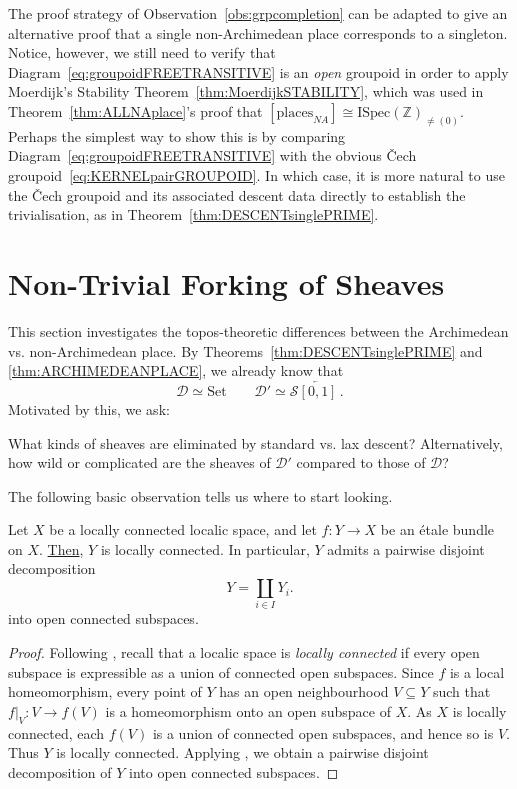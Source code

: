 \documentclass[a4paper, 11pt,reqno]{amsart}
\newcommand{\Set}{\mathrm{Set}}
\newcommand{\ISpec}{\mathrm{ISpec}}
\newcommand{\baseS}{\mathcal{S}}
\newcommand{\D}{\mathcal{D}}
\newcommand{\Z}{\mathbb{Z}}
\begin{document}
\begin{remark} The proof strategy of Observation~\ref{obs:grpcompletion} can be adapted to give an alternative proof that a single non-Archimedean place corresponds to a singleton. Notice, however, we still need to verify that Diagram~\eqref{eq:groupoidFREETRANSITIVE} is an {\em open} groupoid in order to apply Moerdijk's Stability Theorem~\ref{thm:MoerdijkSTABILITY}, which was used in Theorem~\ref{thm:ALLNAplace}'s proof that $[\mathrm{places}_{NA}]\cong \ISpec(\Z)_{\neq (0)}$.  Perhaps the simplest way to show this is by comparing Diagram~\eqref{eq:groupoidFREETRANSITIVE} with the obvious \v{C}ech groupoid~\eqref{eq:KERNELpairGROUPOID}. In which case, it is more natural to use the \v{C}ech groupoid and its associated descent data directly to establish the trivialisation, as in Theorem~\ref{thm:DESCENTsinglePRIME}.
 \end{remark}


\section{Non-Trivial Forking of Sheaves}\label{sec:ARCHvsNONARCH} This section investigates the topos-theoretic differences between the Archimedean vs. non-Archimedean place. By Theorems~\ref{thm:DESCENTsinglePRIME} and \ref{thm:ARCHIMEDEANPLACE}, we already know that
$$\D\simeq\Set\qquad\D'\simeq \baseS\overleftarrow{[0,1]}\,.$$
Motivated by this, we ask: 
\begin{question}\label{qn:forkLAXdescent} What kinds of sheaves are eliminated by standard vs. lax descent? Alternatively, how wild or complicated are the sheaves of $\D'$ compared to those of $\D$? 
\end{question}

The following basic observation tells us where to start looking.

\begin{observation}\label{obs:YdisjointDECOMPOSITION} Let $X$ be a locally connected localic space, and let $f\colon Y\to X$ be an \'{e}tale bundle on $X$. \underline{Then}, $Y$ is locally connected. In particular, $Y$ admits a pairwise disjoint decomposition
		\begin{equation}\label{eq:Ydecomposition}
	Y=\displaystyle\coprod_{i\in I} Y_i.
	\end{equation}
into open connected subspaces. 
\end{observation}
\begin{proof} Following \cite[pp.~525]{Elephant}, recall that a localic space is
	\emph{locally connected} if every open subspace is expressible as a
	union of connected open subspaces. Since $f$ is a local homeomorphism, every point of $Y$ has an open neighbourhood $V\subseteq Y$ such that $f|_V\colon V\to f(V)$ is a homeomorphism onto an open subspace of $X$. As $X$ is locally connected, each $f(V)$ is a union of connected open subspaces, and hence so is $V$. Thus $Y$ is locally connected.  Applying \cite[Lemma~C.1.5.8]{Elephant}, we obtain a pairwise disjoint
	decomposition of $Y$ into open connected subspaces.
\end{proof}
\end{document}
